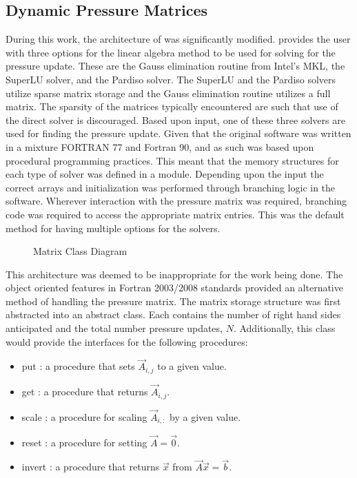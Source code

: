 \subsection{Dynamic Pressure Matrices}
\label{subsect:dynamicPressureMatrices}

During this work, the architecture of \cobra{} was significantly modified.
\cobra{} provides the user with three options for the linear algebra method to be used for solving for the pressure update.
These are the Gauss elimination routine from Intel's MKL, the SuperLU solver, and the Pardiso solver.
The SuperLU and the Pardiso solvers utilize sparse matrix storage and the Gauss elimination routine utilizes a full matrix.
The sparsity of the matrices typically encountered are such that use of the direct solver is discouraged.
Based upon input, one of these three solvers are used for finding the pressure update.
Given that the original software was written in a mixture FORTRAN 77 and Fortran 90, and as such was based upon procedural programming practices.
This meant that the memory structures for each type of solver was defined in a module.
Depending upon the input the correct arrays and initialization was performed through branching logic in the software.
Wherever interaction with the pressure matrix was required, branching code was required to access the appropriate matrix entries.
This was the default method for having multiple options for the solvers.

\begin{figure}[h!]
\singlespace\centering

\caption{Matrix Class Diagram}
\label{fig:matrixClassDiagram}
\end{figure}

This architecture was deemed to be inappropriate for the work being done.
The object oriented features in Fortran 2003/2008 standards provided an alternative method of handling the pressure matrix.
The matrix storage structure was first abstracted into an abstract  class.
Each  contains the number of right hand sides anticipated and the total number pressure updates, $N$.
Additionally, this class would provide the interfaces for the following procedures:

\begin{itemize}
\item{put : a procedure that sets $\vec{A}_{i,j}$ to a given value.}
\item{get : a procedure that returns $\vec{A}_{i,j}$.}
\item{scale : a procedure for scaling $\vec{A}_{i, :}$ by a given value.}
\item{reset : a procedure for setting $\vec{A} = \vec{0}$.}
\item{invert : a procedure that returns $\vec{x}$ from $\vec{A}\vec{x} = \vec{b}$.}
\end{itemize}

